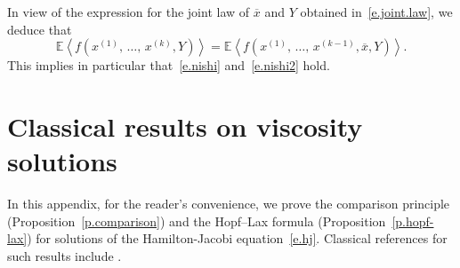 \documentclass[10pt]{amsart}
\theoremstyle{definition}\newtheorem{defi}[theo]{Definition}\newtheorem{rema}[theo]{Remark}\newtheorem{exam}[theo]{Example}\newtheorem{exem}[theo]{Example}\newtheorem{nota}[theo]{Notation}
\newcommand{\E}{\mathbb{E}}
\newcommand{\1}{\mathds{1}}
\newcommand{\la}{\left\langle}
\newcommand{\ra}{\right\rangle}
\renewcommand{\bar}{\overline}
\begin{document}
In view of the expression for the joint law of $\bar x$ and $Y$ obtained in~\eqref{e.joint.law}, we deduce that
\begin{equation}\label{e.real.Nishi}
\E \la f\left(x^{(1)},\,\ldots,\,x^{(k)},Y\right) \ra = \E \la f\left(x^{(1)},\,\ldots,\,x^{(k-1)},\bar x,Y\right) \ra.
\end{equation}
This implies in particular that~\eqref{e.nishi} and~\eqref{e.nishi2} hold.



\section{Classical results on viscosity solutions}\label{s.visc}

In this appendix, for the reader's convenience, we prove the comparison principle (Proposition~\ref{p.comparison}) and the Hopf--Lax formula (Proposition~\ref{p.hopf-lax}) for solutions of the Hamilton-Jacobi equation~\eqref{e.hj}. Classical references for such results include \cite{evans,guide}.
\end{document}
